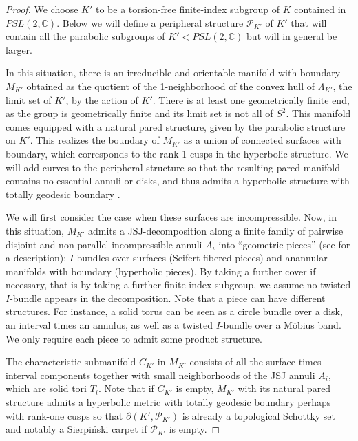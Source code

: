 \documentclass[11pt]{article}
\theoremstyle{definition}
\begin{document}
\begin{proof} 
We choose $K'$ to be a torsion-free finite-index subgroup of $K$ contained in $PSL(2, \mathbb{C})$.
Below we will define a peripheral structure $\mathcal{P}_{K'}$ of $K'$ that will contain all the parabolic subgroups of $K' < PSL(2, \mathbb{C})$ but will in general be larger. 

In this situation, there is 
an irreducible and orientable manifold with boundary $M_{K'}$ obtained as the quotient of the 1-neighborhood of the convex hull of $\Lambda_{K'}$, the limit set of $K'$, by the action of $K'$.  
There is at least one geometrically finite end, as the group is geometrically finite and its limit set is not all of $S^2$. This manifold comes equipped with a natural pared structure, given by the parabolic structure on $K'$. This realizes the boundary of $M_{K'}$ as a union of connected surfaces with boundary, which corresponds to the rank-1 cusps in the hyperbolic structure.  We will add curves to the peripheral structure so that the resulting pared manifold contains no essential annuli or disks, and thus admits a hyperbolic structure with totally geodesic boundary \cite[Theorem B' page 70]{Morgan}.

We will first consider the case when these surfaces are incompressible. Now, in this situation, $M_{K'}$ admits a JSJ-decomposition along a finite family of pairwise disjoint and non parallel incompressible annuli $A_i$ into ``geometric pieces'' (see \cite{characteristic} for a description): $I$-bundles over surfaces (Seifert fibered pieces) and anannular manifolds with boundary (hyperbolic pieces). By taking a further cover if necessary, that is by taking a further finite-index subgroup, we assume no twisted $I$-bundle appears in the decomposition. Note that a piece can have different structures. For instance, a solid torus can be seen as a circle bundle over a disk, an interval times an annulus, as well as a twisted $I$-bundle over a M\"{o}bius band. We only require each piece to admit some product structure.

The characteristic submanifold $C_{K'}$ in $M_{K'}$ consists of all the surface-times-interval components together with small neighborhoods of the JSJ annuli $A_i$, which are solid tori $T_i$. Note that if $C_{K'}$ is empty, $M_{K'}$ with its natural pared structure admits a hyperbolic metric with totally geodesic boundary perhaps with rank-one cusps so that $\partial(K', \mathcal{P}_{K'})$ is already a topological Schottky set and notably a Sierpi\'nski carpet if $\mathcal{P}_{K'}$ is empty.


\end{proof}
\end{document}
